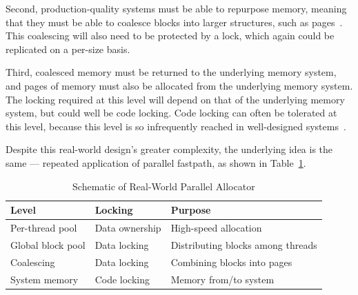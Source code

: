 Second, production-quality systems must be able to repurpose memory,
meaning that they must be able to coalesce blocks into larger structures,
such as pages~\cite{McKenney93}.
This coalescing will also need to be protected by a lock, which again
could be replicated on a per-size basis.

Third, coalesced memory must be returned to the underlying memory
system, and pages of memory must also be allocated from the underlying
memory system.
The locking required at this level will depend on that of the underlying
memory system, but could well be code locking.
Code locking can often be tolerated at this level, because this
level is so infrequently reached in well-designed systems~\cite{McKenney01e}.

Despite this real-world design's greater complexity, the underlying
idea is the same --- repeated application of parallel fastpath,
as shown in
Table~\ref{fig:app:questions:Schematic of Real-World Parallel Allocator}.

\begin{table}[htbp]
{ \scriptsize
\begin{tabular}{l|l|p{1in}}
Level	& Locking & Purpose \\
\hline
Per-thread pool	  & Data ownership & High-speed allocation \\
Global block pool & Data locking   & Distributing blocks among threads \\
Coalescing	  & Data locking   & Combining blocks into pages \\
System memory	  & Code locking   & Memory from/to system \\
\end{tabular}
}
\caption{Schematic of Real-World Parallel Allocator}
\label{fig:app:questions:Schematic of Real-World Parallel Allocator}
\end{table}


